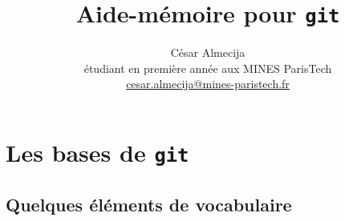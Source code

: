 \documentclass[french]{report}
\begin{document}
\title{Aide-mémoire pour \texttt{git}}
\author{César Almecija
\\ étudiant en première année aux MINES ParisTech
\\ \href{mailto:cesar.almecija@mines-paristech.fr}{cesar.almecija@mines-paristech.fr}}

\maketitle

\chapter{Les bases de \texttt{git}}

\section{Quelques éléments de vocabulaire}
\end{document}
